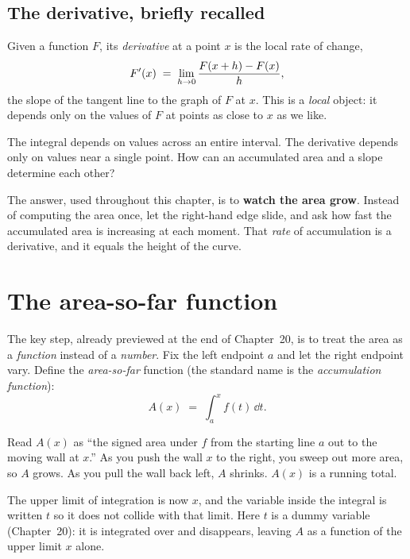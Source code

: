 \subsection{The derivative, briefly recalled}

Given a function $F$, its \emph{derivative} at a point $x$ is the local rate of
change,
\[
  F'(x) \;=\; \lim_{h\to 0}\frac{F(x+h)-F(x)}{h},
\]
the slope of the tangent line to the graph of $F$ at $x$. This is a
\emph{local} object: it depends only on the values of $F$ at points as close to
$x$ as we like.

\begin{intuitionbox}
The integral depends on values across an entire interval. The derivative depends
only on values near a single point. How can an accumulated area and a slope
determine each other?

The answer, used throughout this chapter, is to \textbf{watch the area
grow}. Instead of computing the area once, let the right-hand edge
slide, and ask how fast the accumulated area is increasing at each moment. That
\emph{rate} of accumulation is a derivative, and it equals the height of the
curve.
\end{intuitionbox}

\section{The area-so-far function}

The key step, already previewed at the end of Chapter~20, is to treat the area
as a \emph{function} instead of a \emph{number}. Fix the left endpoint $a$ and let
the right endpoint vary. Define the \emph{area-so-far} function (the standard
name is the \emph{accumulation function}):
\[
  A(x) \;=\; \int_a^x f(t)\,\dd t .
\]

\begin{focusbox}
Read $A(x)$ as ``the signed area under $f$ from the starting line $a$ out to the
moving wall at $x$.'' As you push the wall $x$ to the right, you sweep out more
area, so $A$ grows. As you pull the wall back left, $A$ shrinks. $A(x)$ is a
running total.

The upper limit of integration is now $x$, and the variable inside the integral
is written $t$ so it does not collide with that limit. Here $t$ is a dummy variable
(Chapter~20): it is integrated over and disappears, leaving $A$ as a function of
the upper limit $x$ alone.
\end{focusbox}

